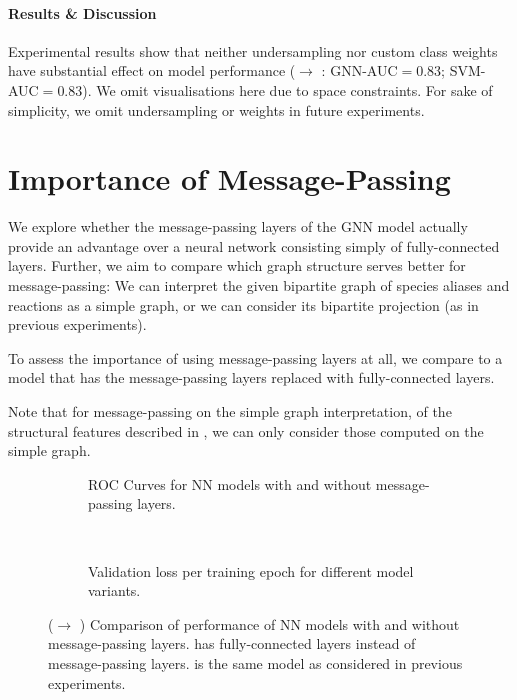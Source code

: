 \documentclass[
	fontsize=10pt, %
	twoside=false, %
	secnumdepth=1, %
  toc=indentunnumbered %
]{kaobook}
\begin{document}
\paragraph{Results \& Discussion} Experimental results show that neither
undersampling nor custom class weights have substantial effect on model
performance (\ADLast $\rightarrow$ \PDMap: GNN-AUC$=0.83$; SVM-AUC$=0.83$). We
omit visualisations here due to space constraints.
For sake of simplicity, we omit undersampling or weights in future experiments.



\section{Importance of Message-Passing}

We explore whether the message-passing layers of the GNN model actually provide
an advantage over a neural network
consisting simply of fully-connected layers. Further, we aim to compare which
graph structure serves better for message-passing: We can interpret the given
bipartite graph of species aliases and reactions as a simple graph, or we can
consider its bipartite projection (as in previous experiments).

To assess the importance of using message-passing layers at all, we compare to a
model that has the message-passing layers replaced with fully-connected layers.

Note that for message-passing on the simple graph interpretation, of the
structural features described in , we can only
consider those computed on the simple graph.

\begin{figure}[h]
  \centering
  \begin{subfigure}[h]{0.48\linewidth}
    \caption{ROC Curves for NN models with and without message-passing layers.}
  \end{subfigure}
  ~~
  \begin{subfigure}[h]{0.48\linewidth}
    \caption{Validation loss per training epoch for different model variants.}
  \end{subfigure}
  \caption{(\ADLast $\rightarrow$ \PDMap) Comparison of performance of NN models
    with and without message-passing layers.  has
    fully-connected layers instead of message-passing layers.
     is the same model as considered in previous
    experiments. }
  \label{fig:importance-message-passing}
\end{figure}
\end{document}
